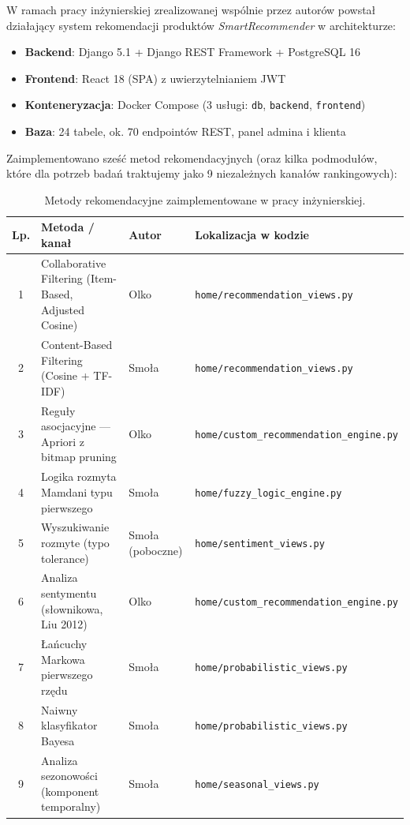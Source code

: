 \documentclass[a4paper,11pt]{article}
\newcommand{\code}[1]{\texttt{\small #1}}
\begin{document}
W ramach pracy inżynierskiej zrealizowanej wspólnie przez autorów powstał działający system rekomendacji produktów \emph{SmartRecommender} w architekturze:

\begin{itemize}[leftmargin=1.5em,itemsep=2pt]
  \item \textbf{Backend}: Django 5.1 + Django REST Framework + PostgreSQL 16
  \item \textbf{Frontend}: React 18 (SPA) z uwierzytelnianiem JWT
  \item \textbf{Konteneryzacja}: Docker Compose (3 usługi: \code{db}, \code{backend}, \code{frontend})
  \item \textbf{Baza}: 24 tabele, ok. 70 endpointów REST, panel admina i klienta
\end{itemize}

\medskip
Zaimplementowano sześć metod rekomendacyjnych (oraz kilka podmodułów, które dla potrzeb badań traktujemy jako 9 niezależnych kanałów rankingowych):

\begin{table}[H]
\centering
\small
\begin{tabularx}{\textwidth}{c Y l l}
\toprule
\textbf{Lp.} & \textbf{Metoda / kanał} & \textbf{Autor} & \textbf{Lokalizacja w kodzie} \\
 & Collaborative Filtering (Item-Based, Adjusted Cosine) & Olko & \code{home/recommendation\_views.py} \\
2 & Content-Based Filtering (Cosine + TF-IDF) & Smoła & \code{home/recommendation\_views.py} \\
3 & Reguły asocjacyjne --- Apriori z bitmap pruning & Olko & \code{home/custom\_recommendation\_engine.py} \\
4 & Logika rozmyta Mamdani typu pierwszego & Smoła & \code{home/fuzzy\_logic\_engine.py} \\
5 & Wyszukiwanie rozmyte (typo tolerance) & Smoła (poboczne) & \code{home/sentiment\_views.py} \\
6 & Analiza sentymentu (słownikowa, Liu 2012) & Olko & \code{home/custom\_recommendation\_engine.py} \\
7 & Łańcuchy Markowa pierwszego rzędu & Smoła & \code{home/probabilistic\_views.py} \\
8 & Naiwny klasyfikator Bayesa & Smoła & \code{home/probabilistic\_views.py} \\
9 & Analiza sezonowości (komponent temporalny) & Smoła & \code{home/seasonal\_views.py} \\
\bottomrule
\end{tabularx}
\caption{Metody rekomendacyjne zaimplementowane w pracy inżynierskiej.}
\end{table}
\end{document}

